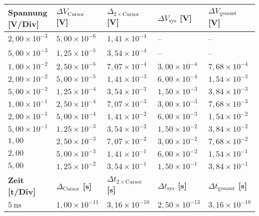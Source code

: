\onecolumn
\begin{table}[h!]
    \vspace{-0.73cm}
    \centering
    \begin{tabular}{l|l|l|l||l}
    \toprule
    \textbf{Spannung [V/Div]} & \textbf{$\Delta V_{\text{Cursor}}$ [V]} & \textbf{$\Delta_{2\times \text{Cursor}}$ [V]} & \textbf{$\Delta V_{\text{sys}}$ [V]} & \textbf{$\Delta V_{\text{gesamt}}$ [V]} \\
    \midrule
    \(2,00\times 10^{-3}\) & \(5,00\times 10^{-6}\) & \(1,41\times 10^{-4}\) & -- & -- \\
    \(5,00\times 10^{-3}\) & \(1,25\times 10^{-5}\) & \(3,54\times 10^{-4}\) & -- & -- \\
    \(1,00\times 10^{-2}\) & \(2,50\times 10^{-5}\) & \(7,07\times 10^{-4}\) & \(3,00\times 10^{-4}\) & \(7,68\times 10^{-4}\) \\
    \(2,00\times 10^{-2}\) & \(5,00\times 10^{-5}\) & \(1,41\times 10^{-3}\) & \(6,00\times 10^{-4}\) & \(1,54\times 10^{-3}\) \\
    \(5,00\times 10^{-2}\) & \(1,25\times 10^{-4}\) & \(3,54\times 10^{-3}\) & \(1,50\times 10^{-3}\) & \(3,84\times 10^{-3}\) \\
    \(1,00\times 10^{-1}\) & \(2,50\times 10^{-4}\) & \(7,07\times 10^{-3}\) & \(3,00\times 10^{-3}\) & \(7,68\times 10^{-3}\) \\
    \(2,00\times 10^{-1}\) & \(5,00\times 10^{-4}\) & \(1,41\times 10^{-2}\) & \(6,00\times 10^{-3}\) & \(1,54\times 10^{-2}\) \\
    \(5,00\times 10^{-1}\) & \(1,25\times 10^{-3}\) & \(3,54\times 10^{-2}\) & \(1,50\times 10^{-2}\) & \(3,84\times 10^{-2}\) \\
    \(1,00\) & \(2,50\times 10^{-3}\) & \(7,07\times 10^{-2}\) & \(3,00\times 10^{-2}\) & \(7,68\times 10^{-2}\) \\
    \(2,00\) & \(5,00\times 10^{-3}\) & \(1,41\times 10^{-1}\) & \(6,00\times 10^{-2}\) & \(1,54\times 10^{-1}\) \\
    \(5,00\) & \(1,25\times 10^{-2}\) & \(3,54\times 10^{-1}\) & \(1,50\times 10^{-1}\) & \(3,84\times 10^{-1}\) \\
    \midrule
    \midrule
    \textbf{Zeit [t/Div]} & \textbf{$\Delta_{\text{Cursor}}$ [s]} & \textbf{$\Delta t_{2\times \text{Cursor}}$ [s]} & \textbf{$\Delta t_{\text{sys}}$ [s]} & \textbf{$\Delta t_{\text{gesamt}}$ [s]} \\
    \midrule
\(5~\text{ns}\) & \(1,00\times 10^{-11}\) & \(3,16\times 10^{-10}\) & \(2,50\times 10^{-13}\) & \(3,16\times 10^{-10}\) \\

\end{tabular}
\end{table}
